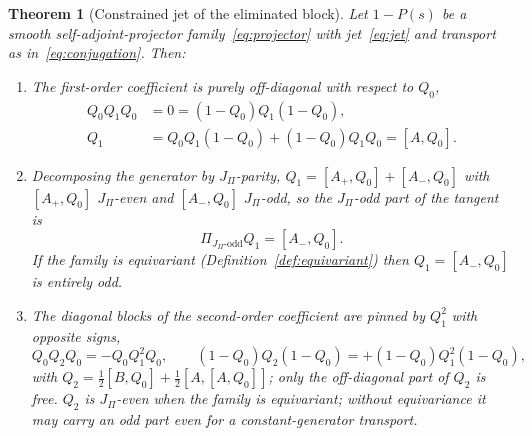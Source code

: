 \documentclass[11pt]{article}
\newtheorem{theorem}{Theorem}
\theoremstyle{definition}
\theoremstyle{remark}
\newcommand{\JPi}{J_{\Pi}}
\newcommand{\Podd}{\Pi_{\JPi\text{-odd}}}
\begin{document}
    \begin{theorem}[Constrained jet of the eliminated block]
      \label{thm:jet}
      Let $1 - P(s)$ be a smooth self-adjoint-projector family~\eqref{eq:projector} with jet~\eqref{eq:jet} and
      transport
      as in~\eqref{eq:conjugation}.
      Then:
      \begin{enumerate}
        \item[(i)] The first-order coefficient is purely off-diagonal with respect to $Q_0$,
          \begin{equation}
            \label{eq:offdiag}
            \begin{aligned}
              Q_0 Q_1 Q_0 &= 0 = (1-Q_0) Q_1 (1-Q_0), \\
              Q_1 &= Q_0 Q_1 (1-Q_0) + (1-Q_0) Q_1 Q_0 = [A, Q_0].
            \end{aligned}
          \end{equation}
        \item[(ii)] Decomposing the generator by $\JPi$-parity, $Q_1 = [A_+, Q_0] + [A_-, Q_0]$ with $[A_+, Q_0]$
          $\JPi$-even and $[A_-, Q_0]$ $\JPi$-odd, so the $\JPi$-odd part of the tangent is
          \begin{equation}
            \label{eq:oddQ1}
            \Podd Q_1 = [A_-, Q_0].
          \end{equation}
          If the family is equivariant (Definition~\ref{def:equivariant}) then $Q_1 = [A_-, Q_0]$ is entirely odd.
        \item[(iii)] The diagonal blocks of the second-order coefficient are pinned by $Q_1^2$ with opposite signs,
          \begin{equation}
            \label{eq:Q2blocks}
            Q_0 Q_2 Q_0 = - Q_0 Q_1^2 Q_0,
            \qquad
            (1-Q_0) Q_2 (1-Q_0) = + (1-Q_0) Q_1^2 (1-Q_0),
          \end{equation}
          with $Q_2 = \tfrac12 [B, Q_0] + \tfrac12 [A, [A, Q_0]]$; only the off-diagonal part of $Q_2$ is free.
          $Q_2$ is $\JPi$-even when the family is equivariant; without equivariance it may carry an odd part even for a
          constant-generator transport.
      \end{enumerate}
    \end{theorem}
\end{document}
